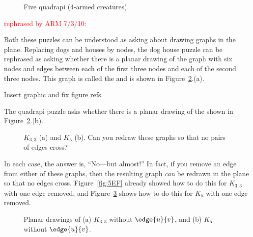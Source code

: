 \begin{figure}


\caption{Five quadrapi (4-armed creatures).}

\label{fig:5DA}

\end{figure}


\begin{editingnotes}
\textcolor{red}{rephrased by ARM 7/3/10:}
\end{editingnotes}

Both these puzzles can be understood as asking about drawing graphs in the
plane.  Replacing dogs and houses by nodes, the dog house puzzle can be
rephrased as asking whether there is a planar drawing of the graph with
six nodes and edges between each of the first three nodes and each of the
second three nodes.  This graph is called the   and is shown in Figure~\ref{fig:nonplanar}.(a).
\begin{editingnotes}
Insert graphic and fix figure refs.
\end{editingnotes}
The quadrapi puzzle asks whether there is a planar drawing of the
  shown in
Figure~\ref{fig:nonplanar}.(b).

\begin{figure}

\qquad\qquad
{}

\caption{$K_{3, 3}$ (a) and $K_5$ (b).  Can you redraw these graphs so
that no pairs of edges cross?}

\label{fig:nonplanar}

\end{figure}

In each case, the answer is, ``No---but almost!''  In fact, if you remove
an edge from either of these graphs, then the resulting graph \emph{can}
be redrawn in the plane so that no edges cross.  Figure~\ref{fig:5EF}
already showed how to do this for $K_{3,3}$ with one edge removed, and
Figure~\ref{fig:5DC} 
shows how to do this for $K_5$ with one edge removed.

\begin{figure}

\qquad
{}

\caption{Planar drawings of (a) $K_{3, 3}$ without $\edge{u}{v}$, and
  (b) $K_5$ without $\edge{u}{v}$.}
\label{fig:5DC}
\end{figure}

